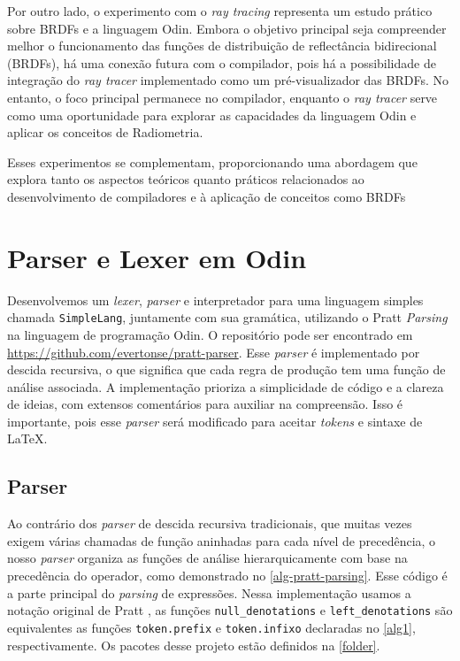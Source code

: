 \documentclass[english, 
               brazil, 
               bsc] %
               {dcomp-abntex2}
\begin{document}
Por outro lado, o experimento com o \textit{ray tracing} representa um estudo prático sobre BRDFs e a linguagem Odin. Embora o objetivo principal seja compreender melhor o funcionamento das funções de distribuição de reflectância bidirecional (BRDFs), há uma conexão futura com o compilador, pois há a possibilidade de integração do \textit{ray tracer} implementado como um pré-visualizador das BRDFs. No entanto, o foco principal permanece no compilador, enquanto o \textit{ray tracer} serve como uma oportunidade para explorar as capacidades da linguagem Odin e aplicar os conceitos de Radiometria.


Esses experimentos se complementam, proporcionando uma abordagem que explora tanto os aspectos teóricos quanto práticos relacionados ao desenvolvimento de compiladores e à aplicação de conceitos como BRDFs


\section{Parser e Lexer em Odin}\label{parser}


Desenvolvemos um \textit{lexer}, \textit{parser} e interpretador para uma linguagem simples chamada \texttt{SimpleLang}, juntamente com sua gramática, utilizando o Pratt \textit{Parsing} na linguagem de programação Odin. O repositório pode ser encontrado em \url{https://github.com/evertonse/pratt-parser}. Esse \textit{parser} é implementado por descida recursiva, o que significa que cada regra de produção tem uma função de análise associada. A implementação prioriza a simplicidade de código e a clareza de ideias, com extensos comentários para auxiliar na compreensão. Isso é importante, pois esse \textit{parser} será modificado para aceitar \textit{tokens} e sintaxe de \LaTeX.


\subsection{Parser}


Ao contrário dos \textit{parser} de descida recursiva tradicionais, que muitas vezes exigem várias chamadas de função aninhadas para cada nível de precedência, o nosso \textit{parser} organiza as funções de análise hierarquicamente com base na precedência do operador, como demonstrado no \autoref{alg-pratt-parsing}. Esse código é a parte principal do \textit{parsing} de expressões. Nessa implementação usamos a notação original de Pratt \cite{pratt}, as funções \texttt{null\_denotations} e \texttt{left\_denotations} são equivalentes as funções \texttt{token.prefix} e \texttt{token.infixo} declaradas no \autoref{alg1}, respectivamente. Os pacotes desse projeto estão definidos na \autoref{folder}.
\end{document}
